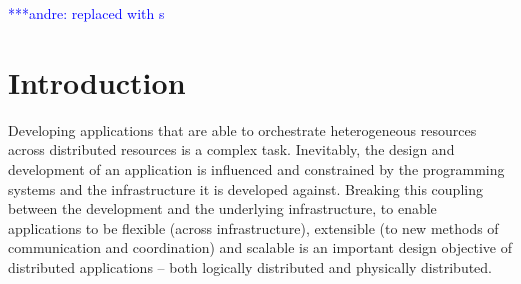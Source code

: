 \documentclass{rspublic}
\newcommand{\alnote}[1]{ {\textcolor{blue} { ***andre: #1 }}}
\newcommand{\alnote}[1]{}
\begin{document}
\begin{abstract}{Replica-Exchange, SAGA, Large-Scale, Production}

\end{abstract}


\alnote{replaced with s}


\section{Introduction}
Developing applications that are able to orchestrate heterogeneous
resources across distributed resources is a complex task.  Inevitably,
the design and development of an application is influenced and
constrained by the programming systems and the infrastructure it is
developed against. Breaking this coupling between the development and
the underlying infrastructure, to enable applications to be flexible
(across infrastructure), extensible (to new methods of communication
and coordination) and scalable is an important design objective of
distributed applications -- both logically distributed and physically
distributed.
\end{document}
